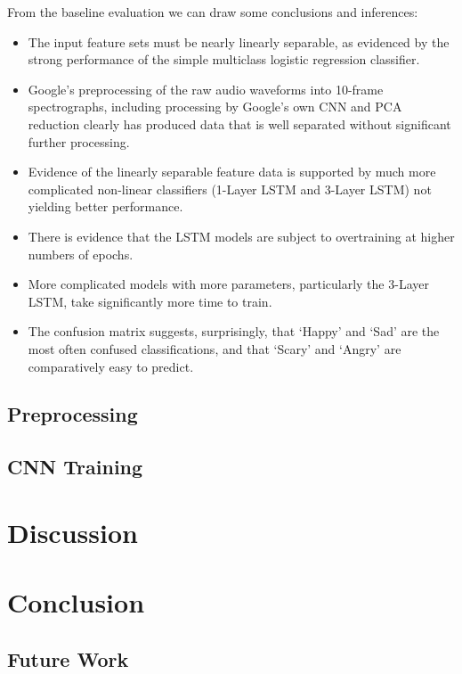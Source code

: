 \documentclass{article}
\begin{document}
From the baseline evaluation we can draw some conclusions and inferences:
\begin{itemize}
\item The input feature sets must be nearly linearly separable, as evidenced by the strong performance of the simple multiclass logistic regression classifier.
\item Google’s preprocessing of the raw audio waveforms into 10-frame spectrographs, including processing by Google’s own CNN and PCA reduction clearly has produced data that is well separated without significant further processing.
\item Evidence of the linearly separable feature data is supported by much more complicated non-linear classifiers (1-Layer LSTM and 3-Layer LSTM) not yielding better performance.
\item There is evidence that the LSTM models are subject to overtraining at higher numbers of epochs.
\item More complicated models with more parameters, particularly the 3-Layer LSTM, take significantly more time to train.
\item The confusion matrix suggests, surprisingly, that ‘Happy’ and ‘Sad’ are the most often confused classifications, and that ‘Scary’ and ‘Angry’ are comparatively easy to predict.
\end{itemize}


\subsection{Preprocessing}

\subsection{CNN Training}

\section{Discussion}

\section{Conclusion}

\subsection{Future Work}
  
 

\end{document}
